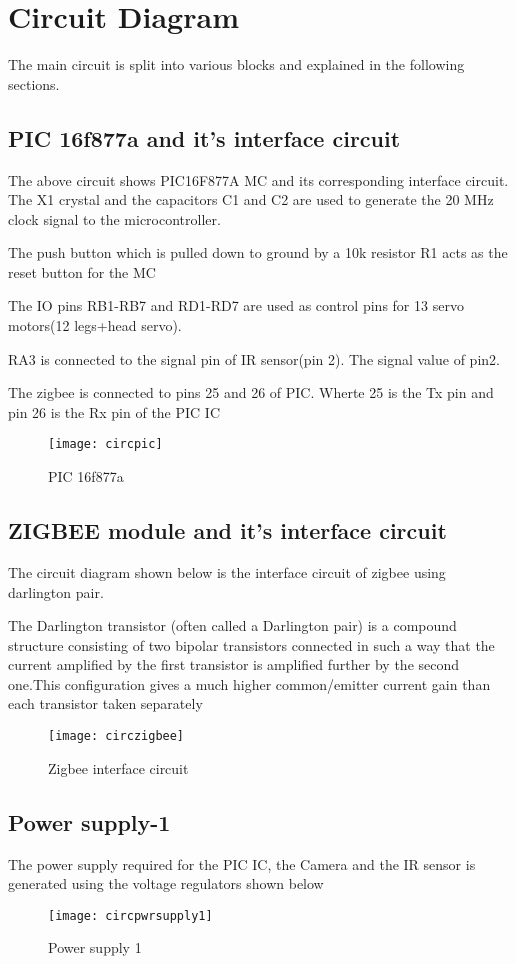 \documentclass{report}
\begin{document}
\section{Circuit Diagram}
The main circuit is split into various blocks and explained in the following sections.
\subsection{PIC 16f877a and it's interface circuit}
The above circuit shows PIC16F877A MC and its corresponding interface circuit. The X1 crystal and the capacitors C1 and C2 are used to generate the 20 MHz clock signal to the microcontroller.

The push button which is pulled down to ground by a 10k resistor R1 acts as the reset button for the MC

The IO pins RB1-RB7 and RD1-RD7 are used as control pins for 13 servo motors(12 legs+head servo).

RA3 is connected to the signal pin of IR sensor(pin 2). The signal value of pin2.

The zigbee is connected to pins 25 and 26 of PIC. Wherte 25 is the Tx pin and pin 26 is the Rx pin of the PIC IC\\
\begin{figure}[h!]
\centering
\texttt{[image: circpic]}
\caption{PIC 16f877a}
\label{fig29}
\end{figure}
\subsection{ZIGBEE module and it's interface circuit}
The circuit diagram shown below is the interface circuit of zigbee using darlington pair.

The Darlington transistor (often called a Darlington pair) is a compound structure consisting of two bipolar transistors connected in such a way that the current amplified by the first transistor is amplified further by the second one.This configuration gives a much higher common/emitter current gain than each transistor taken separately\\
\begin{figure}[h!]
\centering
\texttt{[image: circzigbee]}
\caption{Zigbee interface circuit}
\label{fig210}
\end{figure}
\FloatBarrier

\subsection{Power supply-1}
The power supply required for the PIC IC, the Camera and the IR sensor is generated using the voltage regulators shown below
\begin{figure}[h!]
\centering
\texttt{[image: circpwrsupply1]}
\caption{Power supply 1}
\label{fig211}
\end{figure}
\FloatBarrier
\end{document}
